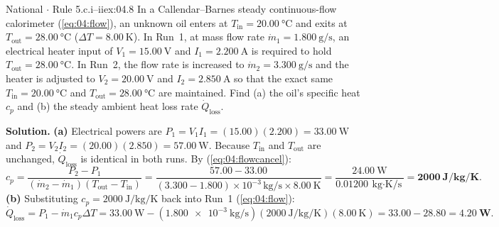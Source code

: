 \begin{workedexample}{National $\cdot$ Rule 5.c.i--ii}{ex:04.8}
In a Callendar--Barnes steady continuous-flow calorimeter (\ref{eq:04:flow}), an unknown oil enters at $T_{\mathrm{in}} = \SI{20.00}{\celsius}$ and exits at $T_{\mathrm{out}} = \SI{28.00}{\celsius}$ ($\Delta T = \SI{8.00}{\kelvin}$). In Run~1, at mass flow rate $\dot{m}_1 = \SI{1.800}{\gram\per\second}$, an electrical heater input of $V_1 = \SI{15.00}{\volt}$ and $I_1 = \SI{2.200}{\ampere}$ is required to hold $T_{\mathrm{out}} = \SI{28.00}{\celsius}$. In Run~2, the flow rate is increased to $\dot{m}_2 = \SI{3.300}{\gram\per\second}$ and the heater is adjusted to $V_2 = \SI{20.00}{\volt}$ and $I_2 = \SI{2.850}{\ampere}$ so that the exact same $T_{\mathrm{in}} = \SI{20.00}{\celsius}$ and $T_{\mathrm{out}} = \SI{28.00}{\celsius}$ are maintained. Find (a) the oil's specific heat $c_p$ and (b) the steady ambient heat loss rate $\dot{Q}_{\mathrm{loss}}$.

\textbf{Solution.}
\textbf{(a)} Electrical powers are $P_1 = V_1 I_1 = (15.00)(2.200) = \SI{33.00}{\watt}$ and $P_2 = V_2 I_2 = (20.00)(2.850) = \SI{57.00}{\watt}$. Because $T_{\mathrm{in}}$ and $T_{\mathrm{out}}$ are unchanged, $\dot{Q}_{\mathrm{loss}}$ is identical in both runs. By (\ref{eq:04:flowcancel}):
\[
  c_p = \frac{P_2 - P_1}{(\dot{m}_2 - \dot{m}_1)(T_{\mathrm{out}} - T_{\mathrm{in}})} = \frac{57.00 - 33.00}{(3.300 - 1.800)\times 10^{-3}\,\si{\kilogram\per\second} \times \SI{8.00}{\kelvin}} = \frac{\SI{24.00}{\watt}}{\SI{0.01200}{\kilogram\cdot\kelvin\per\second}} = \mathbf{\SI{2000}{\joule\per\kilogram\per\kelvin}}.
\]
\textbf{(b)} Substituting $c_p = \SI{2000}{\joule\per\kilogram\per\kelvin}$ back into Run~1 (\ref{eq:04:flow}):
\[
  \dot{Q}_{\mathrm{loss}} = P_1 - \dot{m}_1 c_p \Delta T = \SI{33.00}{\watt} - (\SI{1.800e-3}{\kilogram\per\second})(\SI{2000}{\joule\per\kilogram\per\kelvin})(\SI{8.00}{\kelvin}) = 33.00 - 28.80 = \mathbf{\SI{4.20}{\watt}}.
\]
\end{workedexample}

